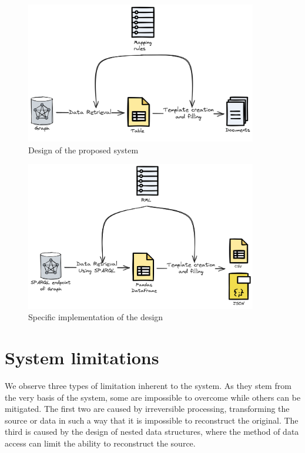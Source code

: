 \begin{figure}
    \centering
    \includegraphics[width=0.9\textwidth]{fig/design.png}
    \caption{Design of the proposed system}
    \label{fig:design}   
\end{figure}

\begin{figure}
    \centering
    \includegraphics[width=0.9\textwidth]{fig/specific_design.png}
    \caption{Specific implementation of the design}
    \label{fig:specific_design}
\end{figure}

\section{System limitations}
\label{section:limitations}

We observe three types of limitation inherent to the system. As they stem from the very basis of the system, some are impossible to overcome while others can be mitigated. The first two are caused by irreversible processing, transforming the source or data in such a way that it is impossible to reconstruct the original. The third is caused by the design of nested data structures, where the method of data access can limit the ability to reconstruct the source.

